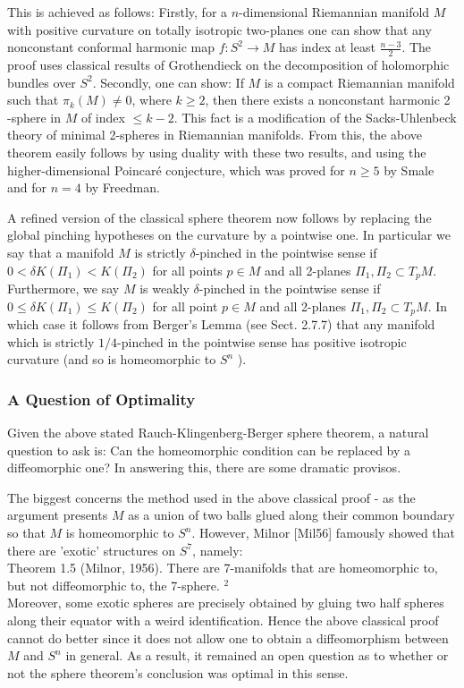 \documentclass[10pt, letterpaper]{article}
\begin{document}
This is achieved as follows: Firstly, for a $n$-dimensional Riemannian manifold $M$ with positive curvature on totally isotropic two-planes one can show that any nonconstant conformal harmonic map $f: S^{2} \rightarrow M$ has index at least $\frac{n-3}{2}$. The proof uses classical results of Grothendieck on the decomposition of holomorphic bundles over $S^{2}$. Secondly, one can show: If $M$ is a compact Riemannian manifold such that $\pi_{k}(M) \neq 0$, where $k \geq 2$, then there exists a nonconstant harmonic 2 -sphere in $M$ of index $\leq k-2$. This fact is a modification of the Sacks-Uhlenbeck theory of minimal 2-spheres in Riemannian manifolds. From this, the above theorem easily follows by using duality with these two results, and using the higher-dimensional Poincaré conjecture, which was proved for $n \geq 5$ by Smale and for $n=4$ by Freedman.

A refined version of the classical sphere theorem now follows by replacing the global pinching hypotheses on the curvature by a pointwise one. In particular we say that a manifold $M$ is strictly $\delta$-pinched in the pointwise sense if $0<\delta K\left(\Pi_{1}\right)<K\left(\Pi_{2}\right)$ for all points $p \in M$ and all 2-planes $\Pi_{1}, \Pi_{2} \subset T_{p} M$. Furthermore, we say $M$ is weakly $\delta$-pinched in the pointwise sense if $0 \leq \delta K\left(\Pi_{1}\right) \leq K\left(\Pi_{2}\right)$ for all point $p \in M$ and all 2-planes $\Pi_{1}, \Pi_{2} \subset T_{p} M$. In which case it follows from Berger's Lemma (see Sect. 2.7.7) that any manifold which is strictly $1 / 4$-pinched in the pointwise sense has positive isotropic curvature (and so is homeomorphic to $S^{n}$ ).

\subsubsection*{A Question of Optimality}
Given the above stated Rauch-Klingenberg-Berger sphere theorem, a natural question to ask is: Can the homeomorphic condition can be replaced by a diffeomorphic one? In answering this, there are some dramatic provisos.

The biggest concerns the method used in the above classical proof - as the argument presents $M$ as a union of two balls glued along their common boundary so that $M$ is homeomorphic to $S^{n}$. However, Milnor [Mil56] famously showed that there are 'exotic' structures on $S^{7}$, namely:\\
Theorem 1.5 (Milnor, 1956). There are 7-manifolds that are homeomorphic to, but not diffeomorphic to, the 7-sphere. ${ }^{2}$\\
Moreover, some exotic spheres are precisely obtained by gluing two half spheres along their equator with a weird identification. Hence the above classical proof cannot do better since it does not allow one to obtain a diffeomorphism between $M$ and $S^{n}$ in general. As a result, it remained an open question as to whether or not the sphere theorem's conclusion was optimal in this sense.
\end{document}
